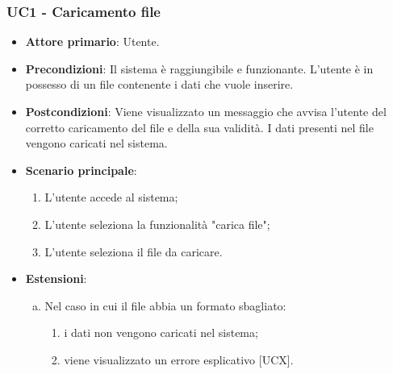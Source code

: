 \subsubsection{UC1 - Caricamento file}
\begin{itemize}
	\item \textbf{Attore primario}: Utente.
	\item \textbf{Precondizioni}: Il sistema è raggiungibile e funzionante. L'utente è in possesso di un file contenente i dati che vuole inserire.
	\item \textbf{Postcondizioni}: Viene visualizzato un messaggio che avvisa l'utente del corretto caricamento del file e della sua validità. I dati presenti nel file vengono caricati nel sistema.
	\item \textbf{Scenario principale}:
		\begin{enumerate}
			\item L'utente accede al sistema;
			\item L'utente seleziona la funzionalità "carica file";
			\item L'utente seleziona il file da caricare.
		\end{enumerate}
	\item \textbf{Estensioni}:
	\begin{enumerate}[(a)]
		\item Nel caso in cui il file abbia un formato sbagliato:
		\begin{enumerate}[1.]
			\item i dati non vengono caricati nel sistema;
			\item viene visualizzato un errore esplicativo [UCX].
		\end{enumerate}
	\end{enumerate}
\end{itemize}